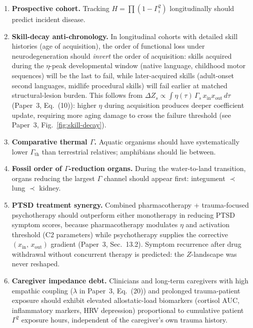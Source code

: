 \documentclass[aps,pre,twocolumn,superscriptaddress,floatfix]{revtex4-2}
\begin{document}
\begin{enumerate}
  \item \textbf{Prospective cohort.}
    Tracking $H = \prod(1-\Gamma_i^2)$ longitudinally
    should predict incident disease.

  \item \textbf{Skill-decay anti-chronology.}
    In longitudinal cohorts with detailed skill histories
    (age of acquisition), the order of functional loss
    under neurodegeneration should \emph{invert} the order
    of acquisition: skills acquired during the $\eta$-peak
    developmental window (native language, childhood motor
    sequences) will be the last to fail, while
    later-acquired skills (adult-onset second languages,
    midlife procedural skills) will fail earlier at matched
    structural-lesion burden.
    This follows from $\Delta Z_s \propto
    \int \eta(\tau)\,\Gamma_s\,x_{\text{in}}
    x_{\text{out}}\,d\tau$
    (Paper~3, Eq.~(10)):
    higher $\eta$ during acquisition produces deeper
    coefficient update, requiring more aging damage
    to cross the failure threshold
    (see Paper~3, Fig.~\ref{fig:skill-decay}).

  \item \textbf{Comparative thermal $\Gamma$.}
    Aquatic organisms should have systematically lower
    $\Gamma_{\text{th}}$ than terrestrial relatives;
    amphibians should lie between.

  \item \textbf{Fossil order of $\Gamma$-reduction organs.}
    During the water-to-land transition, organs reducing
    the largest $\Gamma$ channel should appear first:
    integument $\prec$ lung $\prec$ kidney.

  \item \textbf{PTSD treatment synergy.}
    Combined pharmacotherapy + trauma-focused psychotherapy
    should outperform either monotherapy in reducing
    PTSD symptom scores, because pharmacotherapy modulates
    $\eta$ and activation threshold (C2 parameters) while
    psychotherapy supplies the corrective
    $(x_{\text{in}},\,x_{\text{out}})$ gradient
    (Paper~3, Sec.~13.2).
    Symptom recurrence after drug withdrawal without
    concurrent therapy is predicted: the $Z$-landscape
    was never reshaped.

  \item \textbf{Caregiver impedance debt.}
    Clinicians and long-term caregivers with high empathic
    coupling ($\lambda$ in Paper~3, Eq.~(20))
    and prolonged trauma-patient exposure should exhibit
    elevated allostatic-load biomarkers (cortisol AUC,
    inflammatory markers, HRV depression) proportional
    to cumulative patient $\Gamma^2$ exposure hours,
    independent of the caregiver's own trauma history.


\end{enumerate}
\end{document}
